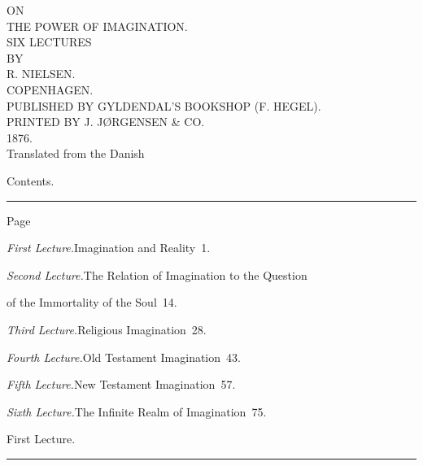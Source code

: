 \documentclass[12pt,a4paper,openany]{book}
\newcommand{\opage}[1]{\marginnote{\footnotesize\textit{[#1]}}}
\newcommand{\lecture}[1]{\clearpage\begin{center}{\large #1}\\[0.4em]\rule{3em}{0.4pt}\end{center}\medskip\noindent}
\begin{document}
\begin{titlepage}
\begin{center}
\vspace*{3em}
{\large ON}\\[1em]
{\Huge THE POWER OF IMAGINATION.}\\[2.5em]
SIX LECTURES\\[1em]
{\small BY}\\[1em]
{\large R. NIELSEN.}\\[5em]
COPENHAGEN.\\[0.5em]
PUBLISHED BY GYLDENDAL'S BOOKSHOP (F. HEGEL).\\[0.5em]
{\small PRINTED BY J. JØRGENSEN \& CO.}\\[0.5em]
{\small 1876.}\\[3em]
{\small Translated from the Danish}
\end{center}
\end{titlepage}

\begin{center}{\large Contents.}\\[0.3em]\rule{3em}{0.4pt}\end{center}
\hfill{\small Page}\par
\noindent\emph{First Lecture.}\enspace Imagination and Reality\dotfill\ 1.\par
\noindent\emph{Second Lecture.}\enspace The Relation of Imagination to the Question\par
\noindent\hspace*{2em}of the Immortality of the Soul\dotfill\ 14.\par
\noindent\emph{Third Lecture.}\enspace Religious Imagination\dotfill\ 28.\par
\noindent\emph{Fourth Lecture.}\enspace Old Testament Imagination\dotfill\ 43.\par
\noindent\emph{Fifth Lecture.}\enspace New Testament Imagination\dotfill\ 57.\par
\noindent\emph{Sixth Lecture.}\enspace The Infinite Realm of Imagination\dotfill\ 75.\par
\clearpage

\setcounter{footnote}{0}%
\lecture{First Lecture.}\opage{1}
\end{document}
